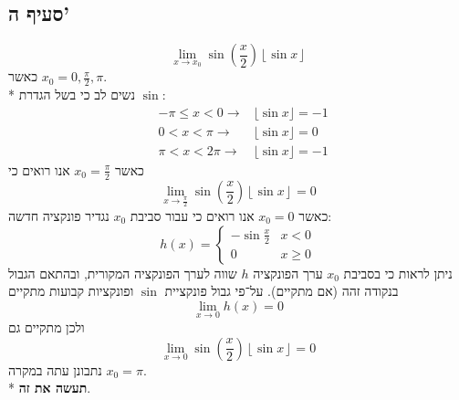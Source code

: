 \subsection{סעיף ה'}
\[
	\lim_{x \to x_0} \sin \left( \frac{x}{2} \right) \left\lfloor \sin x \right\rfloor
\]
כאשר $x_0 = 0, \frac{\pi}{2}, \pi$. \\*
נשים לב כי בשל הגדרת $\sin$:
\begin{align*}
	& -\pi \le x < 0 \rightarrow & \lfloor \sin x \rfloor = -1 \\
	& 0 < x < \pi \rightarrow & \lfloor \sin x \rfloor = 0 \\
	& \pi < x < 2\pi \rightarrow & \lfloor \sin x \rfloor = -1
\end{align*}
כאשר $x_0 = \frac{\pi}{2}$ אנו רואים כי
\[
	\lim_{x \to \frac{\pi}{2}} \sin \left( \frac{x}{2} \right) \left\lfloor \sin x \right\rfloor = 0
\]
כאשר $x_0 = 0$ אנו רואים כי עבור סביבת $x_0$ נגדיר פונקציה חדשה:
\[
	h(x) = \begin{cases}
		-\sin{\frac{x}{2}} & x < 0 \\
		0 & x \ge 0
	\end{cases}
\]
ניתן לראות כי בסביבת $x_0$ ערך הפונקציה $h$ שווה לערך הפונקציה המקורית, ובהתאם הגבול בנקודה זהה (אם מתקיים).
על־פי גבול פונקציית $\sin$ ופונקציות קבועות מתקיים
\[
	\lim_{x \to 0} h(x) = 0
\]
ולכן מתקיים גם
\[
	\lim_{x \to 0} \sin \left( \frac{x}{2} \right) \left\lfloor \sin x \right\rfloor = 0
\]
נתבונן עתה במקרה $x_0 = \pi$. \\*
\textbf{תעשה את זה}.

